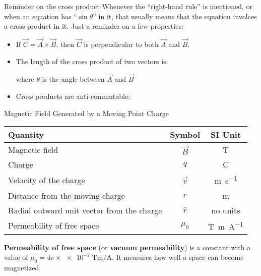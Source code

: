 \documentclass[12pt,aspectratio=169]{beamer}
\begin{document}
\begin{frame}{Reminder on the cross product}
  Whenever the ``right-hand rule'' is mentioned, or when an equation has
  ``$\sin\theta$'' in it, that usually means that the equation involces a
  cross product in it. Just a reminder on a few properties:
  \begin{itemize}
  \item If $\vec C=\vec A\times\vec B$, then $\vec C$ is perpendicular to both
    $\vec A$ and $\vec B$.
  \item The length of the cross product of two vectors is:
    
    where $\theta$ is the angle between $\vec A$ and $\vec B$
  \item Cross products are anti-commutable:

  \end{itemize}
\end{frame}



\begin{frame}{Magnetic Field Generated by a Moving Point Charge}

  \begin{center}
    \begin{tabular}{l|c|c}
      \rowcolor{pink}
      \textbf{Quantity} & \textbf{Symbol} & \textbf{SI Unit} \\ \hline
      Magnetic field                  & $\vec B$ & \si\tesla \\
      Charge                          & $q$      & \si\coulomb \\
      Velocity of the charge          & $\vec v$ & \si{\meter\per\second}\\
      Distance from the moving charge & $r$      & \si\metre\\
      Radial outward unit vector from the charge & $\hat r$ & no units\\
      Permeability of free space & $\mu_0$ & \si{\tesla\metre\per\ampere}
    \end{tabular}
  \end{center}
  \textbf{Permeability of free space} (or \textbf{vacuum permeability}) is a
  constant with a value of
  $\mu_0=4\pi\times\num{e-7}\;\si{\tesla\metre\per\ampere}$. It measures how
  well a space can become magnetized.
\end{frame}
\end{document}

